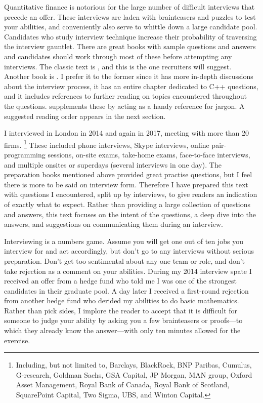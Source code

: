 \documentclass[a4paper]{article}
\begin{document}
Quantitative finance is notorious for the large number of difficult interviews that precede an offer.
These interviews are laden with brainteasers and puzzles to test your abilities, and conveniently also serve to whittle down a large candidate pool.
Candidates who study interview technique increase their probability of traversing the interview gauntlet.
There are great books with sample questions and answers and candidates should work through most of these before attempting any interviews.
The classic text is \citet{HeardOnTheStreet}, and this is the one recruiters will suggest.
Another book is \citet{JoshiQA}.
I prefer it to the former since it has more in-depth discussions about the interview process, it has an entire chapter dedicated to C++ questions, and it includes references to further reading on topics encountered throughout the questions.
\citet{WilmottFAQ} supplements these by acting as a handy reference for jargon.
A suggested reading order appears in the next section.

I interviewed in London in 2014 and again in 2017,
meeting with more than 20 firms.%
\footnote{Including, but not limited to,
  Barclays,
  BlackRock,
  BNP Paribas,
  Cumulus,
  G-research,
  Goldman Sachs,
  GSA Capital,
  JP Morgan,
  MAN group,
  Oxford Asset Management,
  Royal Bank of Canada,
  Royal Bank of Scotland,
  SquarePoint Capital,
  Two Sigma,
  UBS,
and
  Winton Capital.
}
These included phone interviews, Skype interviews, online pair-programming sessions, on-site exams, take-home exams, face-to-face interviews, and multiple onsites or superdays (several interviews in one day).
The preparation books mentioned above provided great practise questions, but I feel there is more to be said on interview form.
Therefore I have prepared this text with questions I encountered, split up by interviews, to give readers an indication of exactly what to expect.
Rather than providing a large collection of questions and answers, this text focuses on the intent of the questions, a deep dive into the answers, and suggestions on communicating them during an interview.

Interviewing is a numbers game.
Assume you will get one out of ten jobs you interview for and act accordingly, but don't go to any interviews without serious preparation.
Don't get too sentimental about any one team or role, and don't take rejection as a comment on your abilities.
During my 2014 interview spate I received an offer from a hedge fund who told me I was one of the strongest candidates in their graduate pool.
A day later I received a first-round rejection from another hedge fund who derided my abilities to do basic mathematics.
Rather than pick sides, I implore the reader to accept that it is difficult for someone to judge your ability by asking you a few brainteasers or proofs---to which they already know the answer---with only ten minutes allowed for the exercise.
\end{document}
